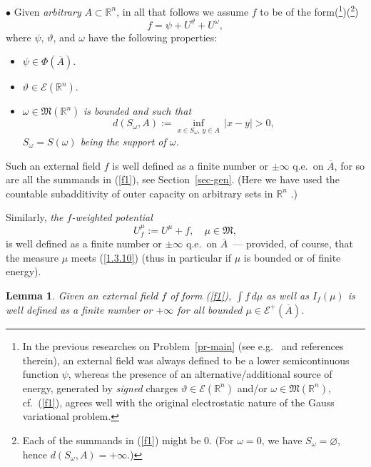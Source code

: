 \documentclass[12pt,a4paper,reqno]{amsart} %
\theoremstyle{lause}
\theoremstyle{maaritelma}
\theoremstyle{lause}
\newtheorem{lemma}[theorem]{Lemma}
\theoremstyle{maaritelma}
\numberwithin{equation}{section}
\begin{document}
$\bullet$ Given {\it arbitrary} $A\subset\mathbb R^n$, in all that follows we assume $f$ to be of the form(\footnote{In the previous researches on Problem~\ref{pr-main} (see e.g.\ \cite{BHS,CSW,Dr0,ST} and references therein), an external field was always defined to be a lower semicontinuous function $\psi$, whereas the presence of an al\-t\-er\-n\-a\-t\-ive/ad\-d\-i\-t\-io\-nal source of energy, generated by {\it signed\/} charges $\vartheta\in\mathcal E(\mathbb R^n)$ and/or $\omega\in\mathfrak M(\mathbb R^n)$, cf.\ (\ref{f1}), agrees well with the original electrostatic nature of the Gauss variational problem.})(\footnote{Each of the summands in (\ref{f1}) might be $0$. (For $\omega=0$, we have $S_\omega=\varnothing$, hence $d(S_\omega,A)=+\infty$.)})
\begin{equation}\label{f1}
 f=\psi+U^\vartheta+U^\omega,
\end{equation}
where $\psi$, $\vartheta$, and $\omega$ have the following properties:
\begin{itemize}
\item[$(\mathcal P_1)$] $\psi\in\Phi(\overline{A})$.
\item[$(\mathcal P_2)$] $\vartheta\in\mathcal E(\mathbb R^n)$.
\item[$(\mathcal P_3)$] $\omega\in\mathfrak M(\mathbb R^n)$ {\it is bounded and such that
  \begin{equation*}\label{d}
    d(S_\omega,A):=\inf_{x\in S_\omega, \ y\in A}\,|x-y|>0,
  \end{equation*}
$S_\omega=S(\omega)$ being the support of\/ $\omega$.}
\end{itemize}

Such an external field $f$ is well defined as a finite number or $\pm\infty$ q.e.\ on $\overline{A}$, for so are all the summands in (\ref{f1}), see Section~\ref{sec-gen}. (Here we have used the countable subadditivity of outer capacity on arbitrary sets in $\mathbb R^n$ \cite[Section~II.2.6]{L}.)

Similarly, {\it the $f$-wei\-g\-h\-t\-ed potential}
\[U^\mu_f:=U^\mu+f,\quad\mu\in\mathfrak M,\]
is well defined as a finite number or $\pm\infty$ q.e.\ on $\overline{A}$~---  provided, of course, that the measure $\mu$ meets (\ref{1.3.10}) (thus in particular if $\mu$ is bounded or of finite energy).

\begin{lemma}\label{int}
Given an external field $f$ of form {\rm(\ref{f1})}, $\int f\,d\mu$ as well as $I_f(\mu)$ is well defined as a finite number or $+\infty$
for all bounded $\mu\in\mathcal E^+(\overline{A})$.
\end{lemma}
\end{document}

